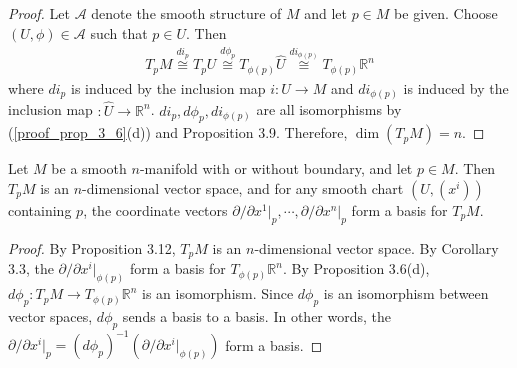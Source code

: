 \begin{proof}
  Let $\mathcal{A}$ denote the smooth structure of $M$ and let $p \in M$ be given.
  Choose $(U, \phi) \in \mathcal{A}$ such that $p \in U$.
  Then
  \begin{align*}
    T_pM \overset{di_p}{\cong} T_pU \overset{d\phi_p}{\cong} T_{\phi(p)} \hat{U} \overset{di_{\phi(p)}}{\cong} T_{\phi(p)}\mathbb{R}^n
  \end{align*}
  where $di_p$ is induced by the inclusion map $i: U \rightarrow M$ and $di_{\phi(p)}$ is induced by the inclusion map $: \hat{U} \rightarrow \mathbb{R}^n$.
  $di_p, d\phi_p, di_{\phi(p)}$ are all isomorphisms by (\ref{proof_prop_3_6}(d)) and Proposition 3.9.
  Therefore, $\dim(T_pM) = n$.
\end{proof}

\begin{customthm}{3.15}
  Let $M$ be a smooth $n$-manifold with or without boundary, and let $p \in M$.
  Then $T_pM$ is an $n$-dimensional vector space, and for any smooth chart $(U, (x^i))$ containing $p$, the coordinate vectors $\partial / \partial x^1\vert_p, \cdots, \partial / \partial x^n\vert_p$ form a basis for $T_pM$.
\end{customthm}

\begin{proof}
  By Proposition 3.12, $T_pM$ is an $n$-dimensional vector space.
  By Corollary 3.3, the $\partial / \partial x^i \vert_{\phi(p)}$ form a basis for $T_{\phi(p)}\mathbb{R}^n$.
  By Proposition 3.6(d), $d\phi_p:T_pM \rightarrow T_{\phi(p)}\mathbb{R}^n$ is an isomorphism.
  Since $d\phi_p$ is an isomorphism between vector spaces, $d\phi_p$ sends a basis to a basis.
  In other words, the $\partial / \partial x^i \vert_p = (d\phi_p)^{-1}(\partial / \partial x^i \vert_{\phi(p)})$ form a basis.
\end{proof}

